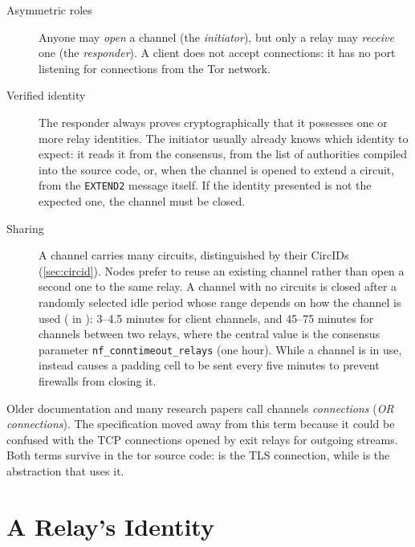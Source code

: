 \begin{description}
  \item[Asymmetric roles] Anyone may \emph{open} a channel (the \emph{initiator}), but only a relay may \emph{receive} one (the \emph{responder}). A client does not accept connections: it has no port listening for connections from the Tor network.
  \item[Verified identity] The responder always proves cryptographically that it possesses one or more relay identities. The initiator usually already knows which identity to expect: it reads it from the consensus, from the list of authorities compiled into the source code, or, when the channel is opened to extend a circuit, from the \texttt{EXTEND2} message itself. If the identity presented is not the expected one, the channel must be closed.
  \item[Sharing] A channel carries many circuits, distinguished by their CircIDs (\cref{sec:circid}). Nodes prefer to reuse an existing channel rather than open a second one to the same relay. A channel with no circuits is closed after a randomly selected idle period whose range depends on how the channel is used ( in ): 3--4.5 minutes for client channels, and 45--75 minutes for channels between two relays, where the central value is the consensus parameter \texttt{nf\_conntimeout\_relays} (one hour). While a channel is in use,  instead causes a padding cell to be sent every five minutes to prevent firewalls from closing it.
\end{description}

\begin{approfondimento}
Older documentation and many research papers call channels \emph{connections} (\emph{OR connections}). The specification moved away from this term because it could be confused with the TCP connections opened by exit relays for outgoing streams. Both terms survive in the tor source code:  is the TLS connection, while  is the abstraction that uses it.
\end{approfondimento}

\section{A Relay's Identity}\label{sec:canale-chiavi}

